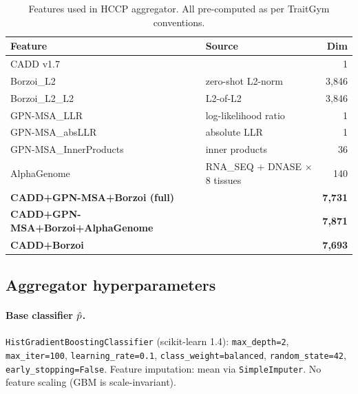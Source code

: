 \begin{table}[h]
\centering
\footnotesize
\caption{Features used in HCCP aggregator. All pre-computed as per TraitGym conventions.}
\setlength{\tabcolsep}{4pt}
\begin{tabular}{llr}
\toprule
Feature & Source & Dim \\
\midrule
CADD v1.7 & \citet{kircher2014cadd} & 1 \\
Borzoi\_L2 & \citet{linder2025borzoi} zero-shot L2-norm & 3{,}846 \\
Borzoi\_L2\_L2 & \citet{linder2025borzoi} L2-of-L2 & 3{,}846 \\
GPN-MSA\_LLR & \citet{benegas2023gpnmsa} log-likelihood ratio & 1 \\
GPN-MSA\_absLLR & \citet{benegas2023gpnmsa} absolute LLR & 1 \\
GPN-MSA\_InnerProducts & \citet{benegas2023gpnmsa} inner products & 36 \\
AlphaGenome & \citet{avsec2026alphagenome} RNA\_SEQ $+$ DNASE $\times$ 8 tissues & 140 \\
\midrule
\textbf{CADD+GPN-MSA+Borzoi (full)} & & \textbf{7{,}731} \\
\textbf{CADD+GPN-MSA+Borzoi+AlphaGenome} & & \textbf{7{,}871} \\
\textbf{CADD+Borzoi} & & \textbf{7{,}693} \\
\bottomrule
\end{tabular}
\end{table}

\subsection{Aggregator hyperparameters}
\label{app:data:hparams}

\paragraph{Base classifier $\hat{p}$.}
\texttt{HistGradientBoostingClassifier} (scikit-learn 1.4): \texttt{max\_depth=2}, \texttt{max\_iter=100}, \texttt{learning\_rate=0.1}, \texttt{class\_weight=balanced}, \texttt{random\_state=42}, \texttt{early\_stopping=False}. Feature imputation: mean via \texttt{SimpleImputer}. No feature scaling (GBM is scale-invariant).

